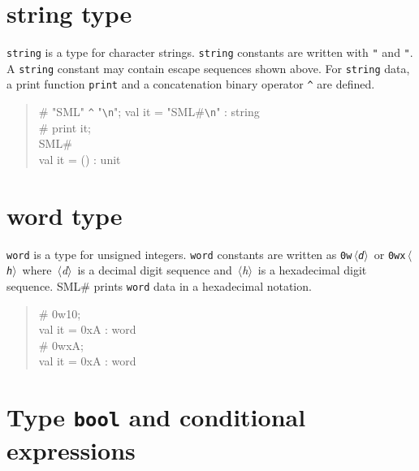 \documentclass{jbook}
\newcommand{\txt}[2]{#2}
\newcommand{\smlsharp}{SML\#}
\newcommand{\nonterm}[1]{\mbox{$\,\langle$}{\it #1}\mbox{$\rangle\,$}}
\newenvironment{program}{\begin{quote}\begin{tt}}%
                        {\end{tt}\end{quote}}
\begin{document}
\section{string type}
	{\tt string} is a type for character strings.
	{\tt string} constants are written with {\tt "} and {\tt "}.
	A {\tt string} constant may contain escape sequences shown
above.
	For {\tt string} data, a print function {\tt print} and a
concatenation binary operator {\tt \verb|^|} are defined.
\begin{program}
\# "SML" \verb|^| "\verb|\n|";
val it = "SML\#\verb|\n|" : string\\
\# print it;\\
SML\#\\
val it = () : unit
\end{program}

\section{word type}
	{\tt word} is a type for unsigned integers.
	{\tt word} constants are written as {\tt 0w\nonterm{d}} or
{\tt 0wx\nonterm{h}} where \nonterm{d} is a decimal digit sequence and
\nonterm{h} is a hexadecimal digit sequence.
	\smlsharp{} prints {\tt word} data in a hexadecimal notation.
\begin{program}
\# 0w10;\\
val it = 0xA : word\\
\# 0wxA;\\
val it = 0xA : word
\end{program}
\fi%

\section{
\txt{{\tt bool}型と条件式}
{Type {\tt bool} and conditional expressions}
}
\label{sec:tutorialConditional}
\end{document}
